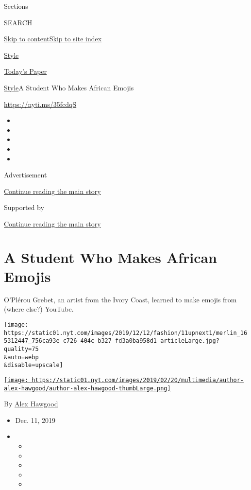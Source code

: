 Sections

SEARCH

\protect\hyperlink{site-content}{Skip to
content}\protect\hyperlink{site-index}{Skip to site index}

\href{https://www.nytimes.com/section/style}{Style}

\href{https://myaccount.nytimes.com/auth/login?response_type=cookie\&client_id=vi}{}

\href{https://www.nytimes.com/section/todayspaper}{Today's Paper}

\href{/section/style}{Style}\textbar{}A Student Who Makes African Emojis

\href{https://nyti.ms/35fcdqS}{https://nyti.ms/35fcdqS}

\begin{itemize}
\item
\item
\item
\item
\item
\end{itemize}

Advertisement

\protect\hyperlink{after-top}{Continue reading the main story}

Supported by

\protect\hyperlink{after-sponsor}{Continue reading the main story}

\hypertarget{a-student-who-makes-african-emojis}{%
\section{A Student Who Makes African
Emojis}\label{a-student-who-makes-african-emojis}}

O'Plérou Grebet, an artist from the Ivory Coast, learned to make emojis
from (where else?) YouTube.

\texttt{[image: https://static01.nyt.com/images/2019/12/12/fashion/11upnext1/merlin\_165312447\_756ca93e-c726-404c-b327-fd3a0ba958d1-articleLarge.jpg?quality=75\\\&auto=webp\\\&disable=upscale]}

\href{https://www.nytimes.com/by/alex-hawgood}{\texttt{[image: https://static01.nyt.com/images/2019/02/20/multimedia/author-alex-hawgood/author-alex-hawgood-thumbLarge.png]}}

By \href{https://www.nytimes.com/by/alex-hawgood}{Alex Hawgood}

\begin{itemize}
\item
  Dec. 11, 2019
\item
  \begin{itemize}
  \item
  \item
  \item
  \item
  \item
  \end{itemize}
\end{itemize}

